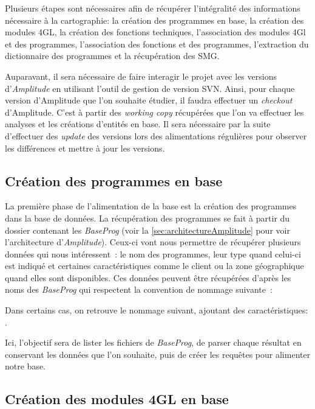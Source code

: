 \documentclass{polytech/polytech}
\begin{document}
Plusieurs étapes sont nécessaires afin de récupérer l'intégralité des informations nécessaire à la cartographie: la création des programmes en base, la création des modules 4GL, la création des fonctions techniques, l'association des modules 4Gl et des programmes, l'association des fonctions et des programmes, l'extraction du dictionnaire des programmes et la récupération des SMG.

Auparavant, il sera nécessaire de faire interagir le projet avec les versions d'\textit{Amplitude} en utilisant l'outil de gestion de version SVN. Ainsi, pour chaque version d’Amplitude que l’on souhaite étudier, il faudra effectuer un \textit{checkout} d’Amplitude. C’est à partir des \textit{working copy} récupérées que l’on va effectuer les analyses et les créations d’entités en base. Il sera nécessaire par la suite d’effectuer des \textit{update} des versions lors des alimentations régulières pour observer les différences et mettre à jour les versions. 

\subsection{Création des programmes en base}

La première phase de l’alimentation de la base est la création des programmes dans la base de données. La récupération des programmes se fait à partir du dossier contenant les \textit{BaseProg} (voir la \autoref{sec:architectureAmplitude} pour voir l'architecture d'\textit{Amplitude}). Ceux-ci vont nous permettre de récupérer plusieurs données qui nous intéressent : le nom des programmes, leur type quand celui-ci est indiqué et certaines caractéristiques comme le client ou la zone géographique quand elles sont disponibles. Ces données peuvent être récupérées d’après les noms des \textit{BaseProg} qui respectent la convention de nommage suivante : 

Dans certains cas, on retrouve le nommage suivant, ajoutant des caractéristiques: . 

Ici, l’objectif sera de lister les fichiers de \textit{BaseProg}, de parser chaque résultat en conservant les données que l’on souhaite, puis de créer les requêtes pour alimenter notre base. 

\subsection{Création des modules 4GL en base}
\end{document}
